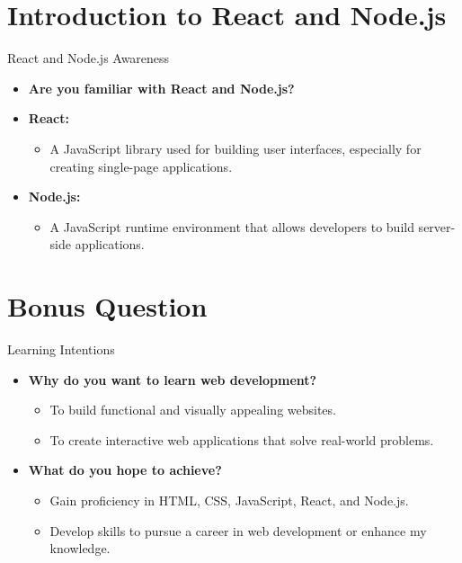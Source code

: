 \documentclass{beamer}
\begin{document}
\section{Introduction to React and Node.js}
\begin{frame}{React and Node.js Awareness}
    \begin{itemize}
        \item \textbf{Are you familiar with React and Node.js?}
        \item \textbf{React:}
        \begin{itemize}
            \item A JavaScript library used for building user interfaces, especially for creating single-page applications.
        \end{itemize}
        \item \textbf{Node.js:}
        \begin{itemize}
            \item A JavaScript runtime environment that allows developers to build server-side applications.
        \end{itemize}
    \end{itemize}
\end{frame}

\section{Bonus Question}
\begin{frame}{Learning Intentions}
    \begin{itemize}
        \item \textbf{Why do you want to learn web development?}
        \begin{itemize}
            \item To build functional and visually appealing websites.
            \item To create interactive web applications that solve real-world problems.
        \end{itemize}
        \item \textbf{What do you hope to achieve?}
        \begin{itemize}
            \item Gain proficiency in HTML, CSS, JavaScript, React, and Node.js.
            \item Develop skills to pursue a career in web development or enhance my  knowledge.
        \end{itemize}
    \end{itemize}
\end{frame}
\end{document}
